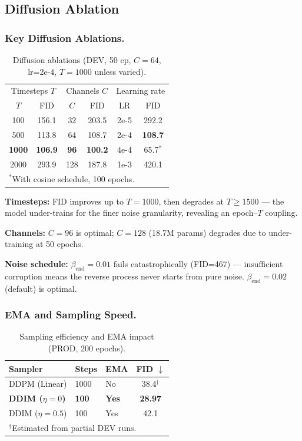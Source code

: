 \documentclass[runningheads]{llncs}
\begin{document}
\subsection{Diffusion Ablation}\label{sec:diff_ablation}

\subsubsection{Key Diffusion Ablations.}

\begin{table}[htbp]
\caption{Diffusion ablations (DEV, 50 ep, $C=64$, lr=2e-4, $T=1000$ unless varied).}\label{tab:diff_ablation}
\centering\small
\begin{tabular}{cc|cc|cc}
\toprule
\multicolumn{2}{c|}{Timesteps $T$} & \multicolumn{2}{c|}{Channels $C$} & \multicolumn{2}{c}{Learning rate} \\
$T$ & FID & $C$ & FID & LR & FID \\
\midrule
100  & 156.1 & 32  & 203.5 & 2e-5 & 292.2 \\
500  & 113.8 & 64  & 108.7 & 2e-4 & \textbf{108.7} \\
\textbf{1000} & \textbf{106.9} & \textbf{96} & \textbf{100.2} & 4e-4 & 65.7$^*$ \\
2000 & 293.9 & 128 & 187.8 & 1e-3 & 420.1 \\
\bottomrule
\multicolumn{6}{l}{\small $^*$With cosine schedule, 100 epochs.}
\end{tabular}
\end{table}

\textbf{Timesteps:} FID improves up to $T=1000$, then degrades at $T \geq 1500$ --- the model under-trains for the finer noise granularity, revealing an epoch--$T$ coupling.

\textbf{Channels:} $C=96$ is optimal; $C=128$ (18.7M params) degrades due to under-training at 50 epochs.

\textbf{Noise schedule:} $\beta_\text{end}=0.01$ fails catastrophically (FID=467) --- insufficient corruption means the reverse process never starts from pure noise. $\beta_\text{end}=0.02$ (default) is optimal.

\subsubsection{EMA and Sampling Speed.}

\begin{table}[htbp]
\caption{Sampling efficiency and EMA impact (PROD, 200 epochs).}\label{tab:diff_sampling}
\centering\small
\begin{tabular}{lllc}
\toprule
Sampler & Steps & EMA & FID $\downarrow$ \\
\midrule
DDPM (Linear) & 1000 & No & 38.4$^\dagger$ \\
\textbf{DDIM ($\eta=0$)} & \textbf{100} & \textbf{Yes} & \textbf{28.97} \\
DDIM ($\eta=0.5$) & 100 & Yes & 42.1 \\
\bottomrule
\multicolumn{4}{l}{\small $^\dagger$Estimated from partial DEV runs.}
\end{tabular}
\end{table}
\end{document}
